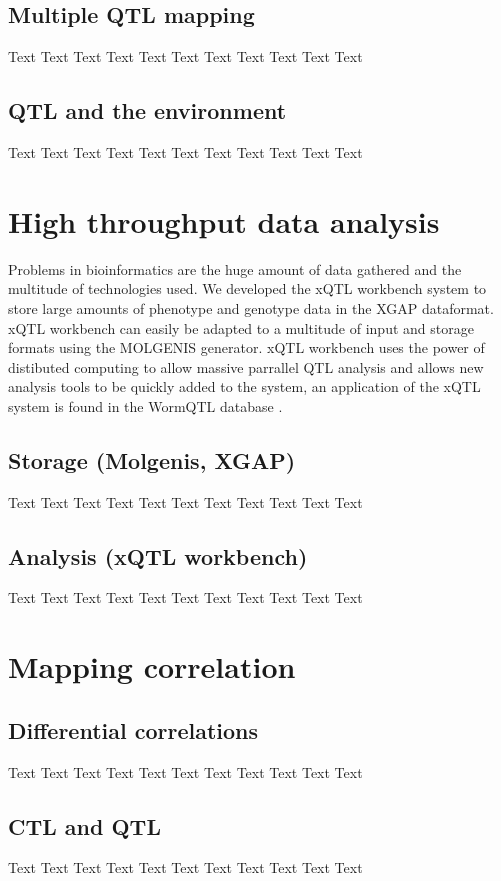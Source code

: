 \documentclass[11pt, twoside, a5paper]{report}
\begin{document}
\section{Multiple QTL mapping}
Text Text Text Text Text Text Text Text Text Text Text

\section{QTL and the environment}
Text Text Text Text Text Text Text Text Text Text Text

\chapter{High throughput data analysis}
Problems in bioinformatics are the huge amount of data gathered and the multitude of technologies used. We developed the xQTL workbench system\cite{Arends:2012} to store large amounts of phenotype and genotype data in the XGAP\cite{Swertz:2010} dataformat. xQTL workbench can easily be adapted to a multitude of input and storage formats using the MOLGENIS\cite{Swertz:2004} generator. xQTL workbench uses the power of distibuted computing to allow massive parrallel QTL analysis and allows new analysis tools to be quickly added to the system, an application of the xQTL system is found in the WormQTL database \cite{Snoek:2012}.
\section{Storage (Molgenis, XGAP)}
Text Text Text Text Text Text Text Text Text Text Text

\section{Analysis (xQTL workbench)}
Text Text Text Text Text Text Text Text Text Text Text

\chapter{Mapping correlation}
\section{Differential correlations}
Text Text Text Text Text Text Text Text Text Text Text

\section{CTL and QTL}
Text Text Text Text Text Text Text Text Text Text Text
\end{document}
